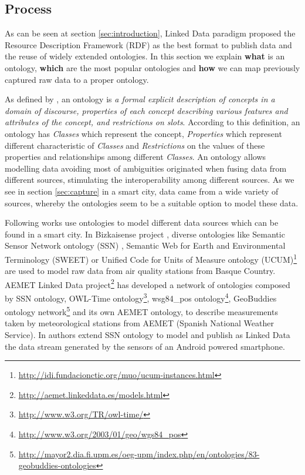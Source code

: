 \subsection{Process}
\label{subsec:process}

As can be seen at section \ref{sec:introduction}, Linked Data paradigm proposed the Resource Description Framework (RDF) as the best format to publish data and the reuse of widely extended ontologies. In this section we explain \textbf{what} is an ontology, \textbf{which} are the most popular ontologies and \textbf{how} we can map previously captured raw data to a proper ontology.

As defined by \cite{noy_ontology_2001}, an ontology is \textit{a formal explicit description of concepts in a domain of discourse, properties of each concept describing various features and attributes of the concept, and restrictions on slots}. According to this definition, an ontology has \textit{Classes} which represent the concept, \textit{Properties} which represent different characteristic of \textit{Classes} and \textit{Restrictions} on the values of these properties and relationships among different \textit{Classes}. An ontology allows modelling data avoiding most of ambiguities originated when fusing data from different sources, stimulating the interoperability among different sources. As we see in section \ref{sec:capture} in a smart city, data came from a wide variety of sources, whereby the ontologies seem to be a suitable option to model these data.

Following works use ontologies to model different data sources which can be found in a smart city. In Bizkaisense project \cite{emaldi_short_2012}, diverse ontologies like Semantic Sensor Network ontology (SSN) \cite{lefort_semantic_2011}, Semantic Web for Earth and Environmental Terminology (SWEET) \cite{raskin_knowledge_2005} or Unified Code for Units of Measure ontology (UCUM)\footnote{\url{http://idi.fundacionctic.org/muo/ucum-instances.html}} are used to model raw data from air quality stations from Basque Country. AEMET Linked Data project\footnote{\url{http://aemet.linkeddata.es/models.html}} has developed a network of ontologies composed by SSN ontology, OWL-Time ontology\footnote{\url{http://www.w3.org/TR/owl-time/}}, wsg84\_pos ontology\footnote{\url{http://www.w3.org/2003/01/geo/wgs84_pos}}, GeoBuddies ontology network\footnote{\url{http://mayor2.dia.fi.upm.es/oeg-upm/index.php/en/ontologies/83-geobuddies-ontologies}} and its own AEMET ontology, to describe measurements taken by meteorological stations from AEMET (Spanish National Weather Service). In \cite{d2011enabling} authors extend SSN ontology to model and publish as Linked Data the data stream generated by the sensors of an Android powered smartphone.

